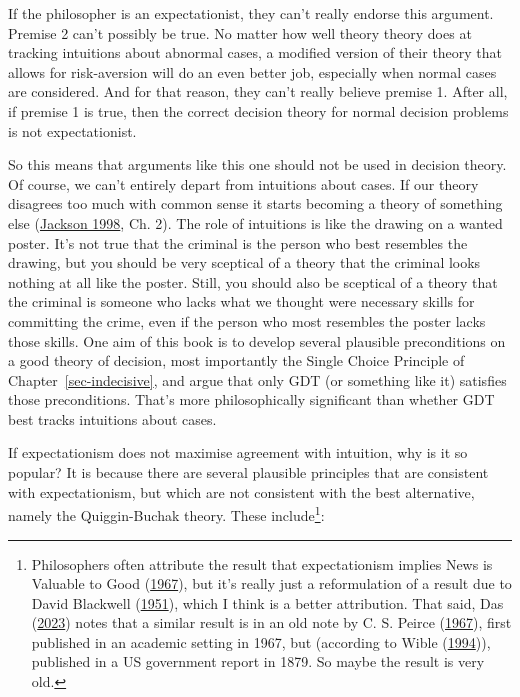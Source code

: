 \documentclass[
  12pt,
  letterpaper,
  DIV=11,
  numbers=noendperiod]{scrreprt}
\begin{document}
If the philosopher is an expectationist, they can't really endorse this
argument. Premise 2 can't possibly be true. No matter how well theory
theory does at tracking intuitions about abnormal cases, a modified
version of their theory that allows for risk-aversion will do an even
better job, especially when normal cases are considered. And for that
reason, they can't really believe premise 1. After all, if premise 1 is
true, then the correct decision theory for normal decision problems is
not expectationist.

So this means that arguments like this one should not be used in
decision theory. Of course, we can't entirely depart from intuitions
about cases. If our theory disagrees too much with common sense it
starts becoming a theory of something else
(\protect\hyperlink{ref-Jackson1998}{Jackson 1998}, Ch. 2). The role of
intuitions is like the drawing on a wanted poster. It's not true that
the criminal is the person who best resembles the drawing, but you
should be very sceptical of a theory that the criminal looks nothing at
all like the poster. Still, you should also be sceptical of a theory
that the criminal is someone who lacks what we thought were necessary
skills for committing the crime, even if the person who most resembles
the poster lacks those skills. One aim of this book is to develop
several plausible preconditions on a good theory of decision, most
importantly the Single Choice Principle of Chapter~\ref{sec-indecisive},
and argue that only GDT (or something like it) satisfies those
preconditions. That's more philosophically significant than whether GDT
best tracks intuitions about cases.

If expectationism does not maximise agreement with intuition, why is it
so popular? It is because there are several plausible principles that
are consistent with expectationism, but which are not consistent with
the best alternative, namely the Quiggin-Buchak theory. These
include\footnote{Philosophers often attribute the result that
  expectationism implies News is Valuable to Good
  (\protect\hyperlink{ref-Good1967}{1967}), but it's really just a
  reformulation of a result due to David Blackwell
  (\protect\hyperlink{ref-Blackwell1951}{1951}), which I think is a
  better attribution. That said, Das
  (\protect\hyperlink{ref-Das2023}{2023}) notes that a similar result is
  in an old note by C. S. Peirce
  (\protect\hyperlink{ref-Peirce1876}{1967}), first published in an
  academic setting in 1967, but (according to Wible
  (\protect\hyperlink{ref-Wible1994}{1994})), published in a US
  government report in 1879. So maybe the result is very old.}:
\end{document}
